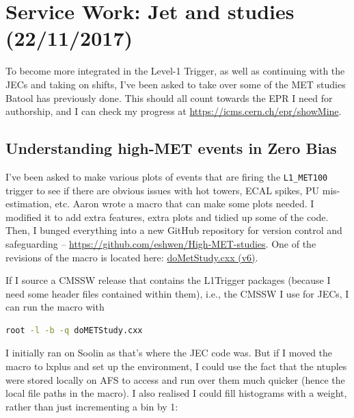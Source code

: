 
\chapter{Service Work: Jet and \texorpdfstring{\etmiss }{ETmiss} studies (22/11/2017)}

To become more integrated in the Level-1 Trigger, as well as continuing with the JECs and taking on shifts, I've been asked to take over some of the MET studies Batool has previously done. This should all count towards the EPR I need for authorship, and I can check my progress at \url{https://icms.cern.ch/epr/showMine}.

\section{Understanding high-MET events in Zero Bias}

I've been asked to make various plots of events that are firing the \texttt{L1\_MET100} trigger to see if there are obvious issues with hot towers, ECAL spikes, PU mis-estimation, etc. Aaron wrote a macro that can make some plots needed. I modified it to add extra features, extra plots and tidied up some of the code. Then, I bunged everything into a new GitHub repository for version control and safeguarding -- \url{https://github.com/eshwen/High-MET-studies}. One of the revisions of the macro is located here: \href{run:modules/Sec 34 - Service Work - ETmiss studies/figures/MET_studies_v6/doMetStudy.cxx}{doMetStudy.cxx (v6)}.

If I source a CMSSW release that contains the L1Trigger packages (because I need some header files contained within them), i.e., the CMSSW I use for JECs, I can run the macro with

\begin{lstlisting}[belowskip=-0.7cm, language=sh, numbers=none]
root -l -b -q doMETStudy.cxx
\end{lstlisting}

I initially ran on Soolin as that's where the JEC code was. But if I moved the macro to lxplus and set up the environment, I could use the fact that the ntuples were stored locally on AFS to access and run over them much quicker (hence the local file paths in the macro). I also realised I could fill histograms with a weight, rather than just incrementing a bin by 1:


